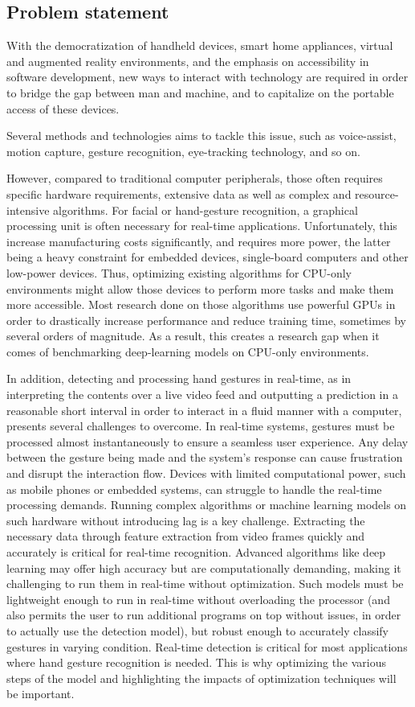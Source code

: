 \documentclass[12pt]{article}
\begin{document}
\subsection{Problem statement}

With the democratization of handheld devices, smart home appliances,  virtual and augmented reality environments, and the emphasis on accessibility in software development, new ways to interact with technology are required in order to bridge the gap between man and machine, and to capitalize on the portable access of these devices. 

Several methods and technologies aims to tackle this issue, such as voice-assist, motion capture, gesture recognition, eye-tracking technology, and so on. 

However, compared to traditional computer peripherals, those often requires specific hardware requirements, extensive data as well as complex and resource-intensive algorithms. For facial or hand-gesture recognition, a graphical processing unit is often necessary for real-time applications. Unfortunately, this increase manufacturing costs significantly, and requires more power, the latter being a heavy constraint for embedded devices, single-board computers and other low-power devices.
Thus, optimizing existing algorithms for CPU-only environments might allow those devices to perform more tasks and make them more accessible. Most research done on those algorithms use powerful GPUs in order to drastically increase performance and reduce training time, sometimes by several orders of magnitude. As a result, this creates a research gap when it comes of benchmarking deep-learning models on CPU-only environments.

In addition, detecting and processing hand gestures in real-time, as in interpreting the contents over a live video feed and outputting a prediction in a reasonable short interval in order to interact in a fluid manner with a computer, presents several challenges to overcome.
In real-time systems, gestures must be processed almost instantaneously to ensure a seamless user experience. Any delay between the gesture being made and the system’s response can cause frustration and disrupt the interaction flow. Devices with limited computational power, such as mobile phones or embedded systems, can struggle to handle the real-time processing demands. Running complex algorithms or machine learning models on such hardware without introducing lag is a key challenge.
Extracting the necessary data through feature extraction from video frames quickly and accurately is critical for real-time recognition. Advanced algorithms like deep learning may offer high accuracy but are computationally demanding, making it challenging to run them in real-time without optimization. Such models must be lightweight enough to run in real-time without overloading the processor (and also permits the user to run additional programs on top without issues, in order to actually use the detection model), but robust enough to accurately classify gestures in varying condition.
Real-time detection is critical for most applications where hand gesture recognition is needed. This is why optimizing the various steps of the model and highlighting the impacts of optimization techniques will be important.
\end{document}
